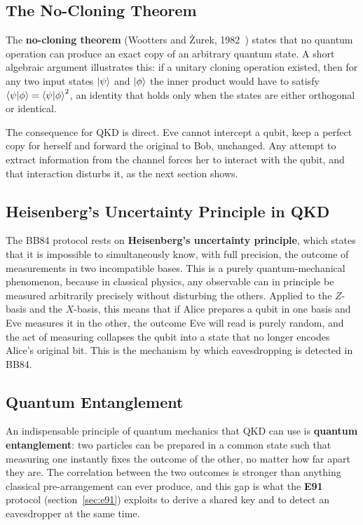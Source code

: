 \documentclass[12pt, a4paper]{article}
\begin{document}
\subsection{The No-Cloning Theorem}
\label{sec:no-cloning}

The \textbf{no-cloning theorem} (Wootters and Żurek,
1982~\cite{wootters1982}) states that no quantum operation can
produce an exact copy of an arbitrary quantum state. A short
algebraic argument illustrates this: if a unitary cloning operation existed, then for any two input states $\ket{\psi}$ and $\ket{\phi}$
the inner product would have to satisfy
$\braket{\psi|\phi} = \braket{\psi|\phi}^2$, an identity that holds
only when the states are either orthogonal or identical.


The consequence for QKD is direct. Eve cannot intercept a qubit, keep a perfect copy for herself and forward the original to Bob, unchanged. Any attempt to extract information from the channel forces her to interact with the qubit, and that interaction disturbs it, as the next section shows.


\subsection{Heisenberg's Uncertainty Principle in QKD}
\label{sec:heisenberg}

The BB84 protocol rests on \textbf{Heisenberg's uncertainty principle}, which states that it is impossible to simultaneously know, with full precision, the outcome of measurements in two incompatible bases. This is a purely quantum-mechanical phenomenon, because in classical physics, any observable can in principle be measured arbitrarily precisely without disturbing the others. Applied to the $Z$-basis and the $X$-basis, this means that if Alice prepares a qubit in one basis and Eve measures it in the other, the outcome Eve will read is purely random, and the act of measuring collapses the qubit into a state that no longer encodes Alice's original bit. This is the mechanism by which eavesdropping is detected in BB84. 

\subsection{Quantum Entanglement}
\label{sec:entanglement}

An indispensable principle of quantum mechanics that QKD can use is
\textbf{quantum entanglement}: two particles can be prepared in a
common state such that measuring one instantly fixes the outcome of
the other, no matter how far apart they are. The correlation between
the two outcomes is stronger than anything classical pre-arrangement
can ever produce, and this gap is what the \textbf{E91} protocol
(section~\ref{sec:e91}) exploits to derive a shared key and to detect
an eavesdropper at the same time. 
\end{document}
